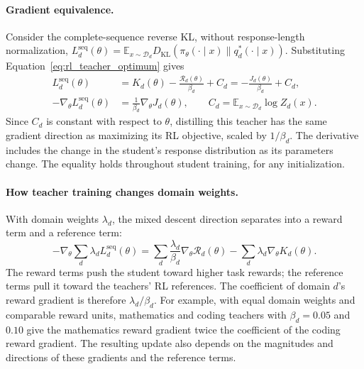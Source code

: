 \paragraph{Gradient equivalence.}
Consider the complete-sequence reverse KL, without response-length
normalization,
$L_d^{\mathrm{seq}}(\theta)=\mathbb E_{x\sim\mathcal D_d}
D_{\mathrm{KL}}(\pi_\theta(\cdot\mid x)\|q_d^*(\cdot\mid x))$.
Substituting Equation~\ref{eq:rl_teacher_optimum} gives
\begin{equation}
\begin{aligned}
L_d^{\mathrm{seq}}(\theta)
&=K_d(\theta)-\frac{\mathcal R_d(\theta)}{\beta_d}+C_d
=-\frac{J_d(\theta)}{\beta_d}+C_d,\\
-\nabla_\theta L_d^{\mathrm{seq}}(\theta)
&=\frac{1}{\beta_d}\nabla_\theta J_d(\theta),
\qquad C_d=\mathbb E_{x\sim\mathcal D_d}\log Z_d(x).
\end{aligned}
\label{eq:rl_teacher_gradient}
\end{equation}
Since $C_d$ is constant with respect to $\theta$, distilling this teacher
has the same gradient direction as maximizing its RL objective, scaled
by $1/\beta_d$. The derivative includes the change in the student's
response distribution as its parameters change. The equality holds
throughout student training, for any initialization.

\paragraph{How teacher training changes domain weights.}
With domain weights $\lambda_d$, the mixed descent direction separates
into a reward term and a reference term:
\begin{equation}
-\nabla_\theta\sum_d\lambda_d L_d^{\mathrm{seq}}(\theta)
=\sum_d\frac{\lambda_d}{\beta_d}\nabla_\theta\mathcal R_d(\theta)
  -\sum_d\lambda_d\nabla_\theta K_d(\theta).
\label{eq:rl_teacher_mixture}
\end{equation}
The reward terms push the student toward higher task rewards; the
reference terms pull it toward the teachers' RL references. The coefficient
of domain $d$'s reward gradient is therefore $\lambda_d/\beta_d$.
For example, with equal domain weights and comparable reward units,
mathematics and coding teachers with $\beta_d=0.05$ and $0.10$ give
the mathematics reward gradient twice the coefficient of the coding
reward gradient. The resulting update also depends on the magnitudes
and directions of these gradients and the reference terms.

